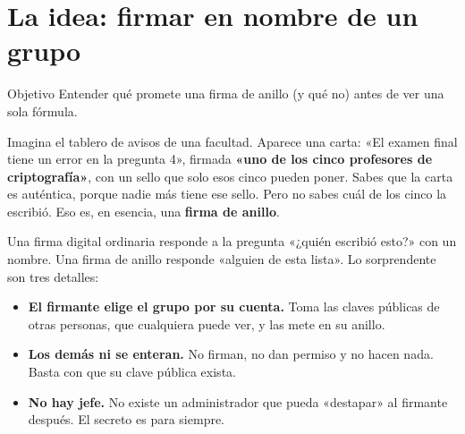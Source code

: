 \documentclass[11pt,a4paper]{article}
\theoremstyle{definition}
\theoremstyle{plain}
\theoremstyle{remark}
\begin{document}
\section{La idea: firmar en nombre de un grupo}\label{sec:idea}

\begin{nota}{Objetivo}
Entender qué promete una firma de anillo (y qué no) antes de ver una sola fórmula.
\end{nota}

Imagina el tablero de avisos de una facultad. Aparece una carta: «El examen final
tiene un error en la pregunta 4», firmada \textbf{«uno de los cinco profesores de
criptografía»}, con un sello que solo esos cinco pueden poner. Sabes que la carta
es auténtica, porque nadie más tiene ese sello. Pero no sabes cuál de los cinco la
escribió. Eso es, en esencia, una \textbf{firma de anillo}.

Una firma digital ordinaria responde a la pregunta «¿quién escribió esto?» con un
nombre. Una firma de anillo responde «alguien de esta lista». Lo sorprendente son
tres detalles:

\begin{itemize}[leftmargin=1.6em,itemsep=0.3em]
  \item \textbf{El firmante elige el grupo por su cuenta.} Toma las claves públicas
    de otras personas, que cualquiera puede ver, y las mete en su anillo.
  \item \textbf{Los demás ni se enteran.} No firman, no dan permiso y no hacen nada.
    Basta con que su clave pública exista.
  \item \textbf{No hay jefe.} No existe un administrador que pueda «destapar» al
    firmante después. El secreto es para siempre.
\end{itemize}
\end{document}
